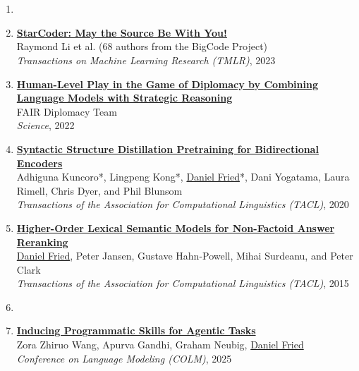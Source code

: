 \section{}

\begin{enumerate}[leftmargin=-1mm,partopsep=0pt]

\item[]

\item \href{https://arxiv.org/abs/2305.06161}{\textbf{StarCoder: May the Source Be With You!}} \\
  Raymond Li et al. (68 authors from the BigCode Project)\\
  \emph{Transactions on Machine Learning Research (TMLR)}, 2023

\item \href{https://www.science.org/doi/10.1126/science.ade9097}{\textbf{Human-Level Play in the Game of Diplomacy by Combining Language Models with Strategic Reasoning}} \\
  FAIR Diplomacy Team\\
  \emph{Science}, 2022

\item \href{https://www.mitpressjournals.org/doi/full/10.1162/tacl_a_00345}{\textbf{Syntactic Structure Distillation Pretraining for Bidirectional Encoders}} \\
  Adhiguna Kuncoro*, Lingpeng Kong*, \underline{Daniel Fried}*, Dani Yogatama, Laura Rimell, Chris Dyer, and Phil Blunsom\\
  \emph{Transactions of the Association for Computational Linguistics (TACL)}, 2020

\item \href{https://people.eecs.berkeley.edu/~dfried/papers/tacl2015-qa.pdf}{\textbf{Higher-Order Lexical Semantic Models for Non-Factoid Answer Reranking}} \\
  \underline{Daniel Fried}, Peter Jansen, Gustave Hahn-Powell, Mihai Surdeanu, and Peter Clark\\
  \emph{Transactions of the Association for Computational Linguistics (TACL)}, 2015

\item[]

\item \href{https://arxiv.org/abs/2504.06821}{\textbf{Inducing Programmatic Skills for Agentic Tasks}} \\
  Zora Zhiruo Wang, Apurva Gandhi, Graham Neubig, \underline{Daniel Fried}\\
  \emph{Conference on Language Modeling (COLM)}, 2025


\end{enumerate}
